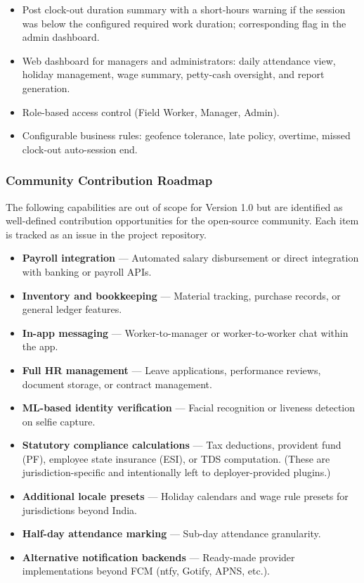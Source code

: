 \documentclass[12pt, a4paper]{article}
\begin{document}
\begin{itemize}
    \item Post clock-out duration summary with a short-hours warning if
          the session was below the configured required work duration;
          corresponding flag in the admin dashboard.
    \item Web dashboard for managers and administrators: daily attendance
          view, holiday management, wage summary, petty-cash oversight,
          and report generation.
    \item Role-based access control (Field Worker, Manager, Admin).
    \item Configurable business rules: geofence tolerance, late policy,
          overtime, missed clock-out auto-session end.
\end{itemize}

\subsubsection*{Community Contribution Roadmap}

The following capabilities are out of scope for Version 1.0 but are
identified as well-defined contribution opportunities for the open-source
community. Each item is tracked as an issue in the project repository.

\begin{itemize}
    \item \textbf{Payroll integration} --- Automated salary disbursement
          or direct integration with banking or payroll APIs.
    \item \textbf{Inventory and bookkeeping} --- Material tracking,
          purchase records, or general ledger features.
    \item \textbf{In-app messaging} --- Worker-to-manager or
          worker-to-worker chat within the app.
    \item \textbf{Full HR management} --- Leave applications, performance
          reviews, document storage, or contract management.
    \item \textbf{ML-based identity verification} --- Facial recognition
          or liveness detection on selfie capture.
    \item \textbf{Statutory compliance calculations} --- Tax deductions,
          provident fund (PF), employee state insurance (ESI), or TDS
          computation. (These are jurisdiction-specific and intentionally
          left to deployer-provided plugins.)
    \item \textbf{Additional locale presets} --- Holiday calendars and
          wage rule presets for jurisdictions beyond India.
    \item \textbf{Half-day attendance marking} --- Sub-day attendance
          granularity.
    \item \textbf{Alternative notification backends} --- Ready-made
          provider implementations beyond FCM (ntfy, Gotify, APNS, etc.).
\end{itemize}
\end{document}
